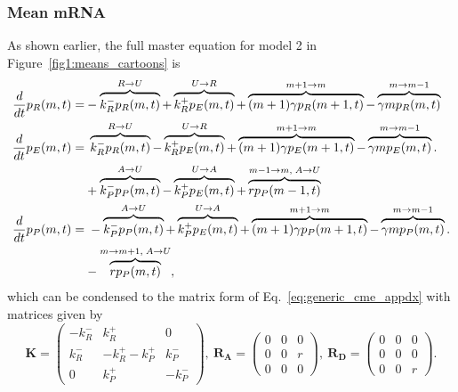 \subsubsection{Mean mRNA}
As shown earlier, the full master equation for model 2 in
Figure~\ref{fig1:means_cartoons} is
\begin{align}
\begin{split}
\frac{d {}}{d t}p_R(m,t) =& 
- \overbrace{k_R^- p_R(m,t)}^{R \rightarrow U}
+ \overbrace{k_R^+ p_E(m,t)}^{U \rightarrow R}
+ \overbrace{(m+1)\gamma p_R(m+1,t)}^{m + 1 \rightarrow m}
- \overbrace{\gamma mp_R(m,t)}^{m \rightarrow m - 1}
\\
\frac{d {}}{d t}p_E(m,t) =&\; 
    \overbrace{k_R^- p_R(m,t)}^{R \rightarrow U}
- \overbrace{k_R^+ p_E(m,t)}^{U \rightarrow R}
+ \overbrace{(m+1)\gamma p_E(m+1,t)}^{m + 1 \rightarrow m}
- \overbrace{\gamma mp_E(m,t)}^{m \rightarrow m - 1}.
\\
&
+ \overbrace{k_P^- p_P(m,t)}^{A \rightarrow U}
- \overbrace{k_P^+ p_E(m,t)}^{U \rightarrow A}
+ \overbrace{rp_P(m-1,t)}^{m-1 \rightarrow m,\;A \rightarrow U}
\\
\frac{d {}}{d t}p_P(m,t) =&\; 
- \overbrace{k_P^- p_P(m,t)}^{A \rightarrow U}
+ \overbrace{k_P^+ p_E(m,t)}^{U \rightarrow A}
+ \overbrace{(m+1)\gamma p_P(m+1,t)}^{m + 1 \rightarrow m}
- \overbrace{\gamma mp_P(m,t)}^{m \rightarrow m - 1}.
\\
&- \overbrace{rp_P(m,t)}^{m \rightarrow m + 1,\;A \rightarrow U},
\end{split}
\end{align}
which can be condensed to the matrix form of Eq.~\ref{eq:generic_cme_appdx} with
matrices given by
\begin{equation}
\mathbf{K} = \begin{pmatrix} -k_R^- & k_R^+ & 0 \\
                        k_R^- & -k_R^+ -k_P^+ & k_P^- \\
                        0 & k_P^+ & -k_P^- 
                \end{pmatrix},\
\mathbf{R_A} = \begin{pmatrix}
                0 & 0 & 0 \\ 
                0 & 0 & r \\ 
                0 & 0 & 0
                \end{pmatrix},\
\mathbf{R_D} = \begin{pmatrix}
                0 & 0 & 0 \\ 
                0 & 0 & 0 \\ 
                0 & 0 & r
                \end{pmatrix}.
\label{eq:model2_matrices_appdx}
\end{equation}
